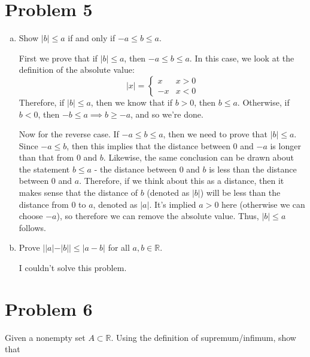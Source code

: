 \documentclass[10pt]{article}
\begin{document}
    \pagebreak 
    \section*{Problem 5}
    \begin{enumerate}[(a)]
        \item Show $|b| \le a$ if and only if $-a \le b \le a$. 
        
        \begin{solution}
            First we prove that if $|b| \le a$, then $-a \le b \le a$. In this case, we look at the definition of the absolute value: 
            \[ |x| = \begin{cases}
                x & x > 0\\
                -x & x < 0
            \end{cases}\] 
            Therefore, if $|b| \le a$, then we know that if $b > 0$, then $b \le a$. Otherwise, if $b < 0$, then $-b \le a \implies b \ge -a$, and so we're done. 

            Now for the reverse case. If $-a \le b \le a$, then we need to prove that $|b| \le a$. Since $-a \le b$, then this implies that the distance between 0 and $-a$ is longer than that from $0$ and $b$. Likewise, the same conclusion can be drawn about the statement $b \le a$ - the distance between 0 and $b$ is less than the distance between 0 and $a$. Therefore, if we think about this as a distance, then it makes sense that the distance of $b$ (denoted as $|b|$) will be less than the distance from 0 to $a$, denoted as $|a|$. It's implied $a > 0$ here (otherwise we can choose $-a$), so therefore we can remove the absolute value. Thus, $|b| \le a$ follows.
        \end{solution}
        \item Prove $||a| - |b|| \le |a - b|$ for all $a, b \in \mathbb R$.
        
        \begin{solution}
            I couldn't solve this problem.
        \end{solution}
    \end{enumerate}

    \pagebreak

    \section*{Problem 6}

    Given a nonempty set $A \subset \mathbb R$. Using the definition of supremum/infimum, show that 
\end{document}
